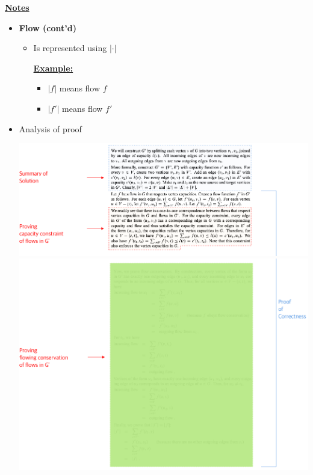 \documentclass[12pt]{article}
\begin{document}
\begin{enumerate}[1.]
\begin{enumerate}[a)]
        \bigskip

        \underline{\textbf{Notes}}

        \bigskip

        \begin{itemize}
            \item \textbf{Flow (cont'd)}

            \begin{itemize}
                \item Is represented using $\lvert \cdot \rvert$

                \bigskip

                \underline{\textbf{Example:}}

                \bigskip

                \begin{itemize}
                    \item $\lvert f \rvert$ means flow $f$
                    \item $\lvert f' \rvert$ means flow $f'$
                \end{itemize}
            \end{itemize}
            \item Analysis of proof

            \begin{center}
            \includegraphics[width=\linewidth]{images/worksheet_5_solution_27.png}
            \includegraphics[width=\linewidth]{images/worksheet_5_solution_28.png}
            \end{center}
        \end{itemize}



\end{enumerate}
\end{enumerate}
\end{document}
